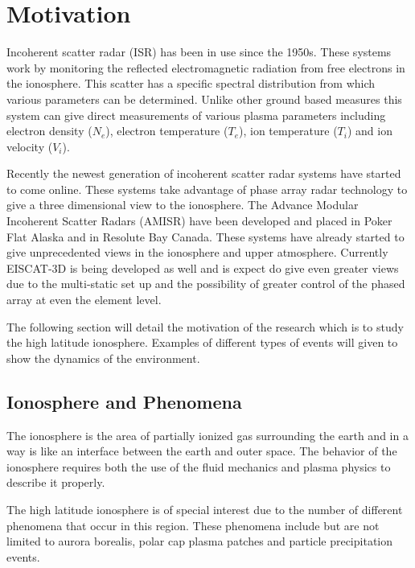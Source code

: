 \chapter{Motivation}
\label{chapter:body}
\thispagestyle{myheadings}
\setcounter{tocdepth}{1}
\graphicspath{{1_Intro/Figures/}}

Incoherent scatter radar (ISR) has been in use since the 1950s\cite{gordon58}.  These systems work by monitoring the reflected electromagnetic radiation from free electrons in the ionosphere.  This scatter has a specific spectral distribution from which various parameters can be determined.  Unlike other ground based measures this system can give direct measurements of various plasma parameters including electron density ($N_e$), electron temperature ($T_e$), ion temperature ($T_i$) and ion velocity ($V_i$). 

Recently the newest generation of incoherent scatter radar systems have started to come online.  These systems take advantage of phase array radar technology to give a three dimensional view to the ionosphere.  The Advance Modular Incoherent Scatter Radars (AMISR) have been developed and placed in Poker Flat Alaska and in Resolute Bay Canada.  These systems have already started to give unprecedented views in the ionosphere and upper atmosphere.  Currently EISCAT-3D is being developed as well and is expect do give even greater views due to the multi-static set up and the possibility of greater control of the phased array at even the element level.

The following section will detail the motivation of the research which is to study the high latitude ionosphere.  Examples of different types of events will given to show the dynamics of the environment. 


\section{Ionosphere and Phenomena}
The ionosphere is the area of partially ionized gas surrounding the earth and in a way is like an interface between the earth and outer space\cite{kellybook}.  The behavior of the ionosphere requires both the use of the fluid mechanics and plasma physics to describe it properly.  

The high latitude ionosphere is of special interest due to the number of different phenomena that occur in this region.  These phenomena include but are not limited to aurora borealis, polar cap plasma patches and particle precipitation events.  

